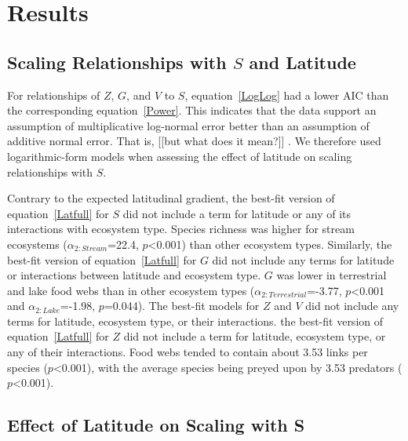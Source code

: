 \documentclass[12pt]{article}
\begin{document}
\section*{Results}

\subsection*{Scaling Relationships with $S$ and Latitude}

For relationships of $Z$, $G$, and $V$ to $S$, equation~\ref{LogLog} had a lower AIC than the corresponding
equation~\ref{Power}. This indicates that the data support an assumption of multiplicative log-normal
error better than an assumption of additive normal error. That is, [[but what does it mean?]] . 
We therefore used logarithmic-form models when assessing the effect of latitude on scaling relationships 
with $S$. 


Contrary to the expected latitudinal gradient, the best-fit version of equation~\ref{Latfull} for $S$
did not include a term for latitude or any of its interactions with ecosystem type. Species richness was
higher for stream ecosystems ($\alpha_{2:Stream}$=22.4, $p$\textless0.001) than other ecosystem types. 
Similarly, the best-fit version of equation~\ref{Latfull} for $G$ did not include 
any terms for latitude or interactions between latitude and ecosystem type. $G$ was lower in terrestrial
and lake food webs than in other ecosystem types ($\alpha_{2:Terrestrial}$=-3.77, $p$\textless0.001 and 
$\alpha_{2:Lake}$=-1.98, $p$=0.044). The best-fit models for $Z$ and $V$ did not include any terms for
latitude, ecosystem type, or their interactions.
the best-fit version of equation~\ref{Latfull} for $Z$ did not include a term for latitude,
ecosystem type, or any of their interactions. Food webs tended to contain about 3.53 links per species
($p$\textless0.001), with the average species being preyed upon by 3.53 predators ($p$\textless0.001).


\subsection*{Effect of Latitude on Scaling with S}
\end{document}
